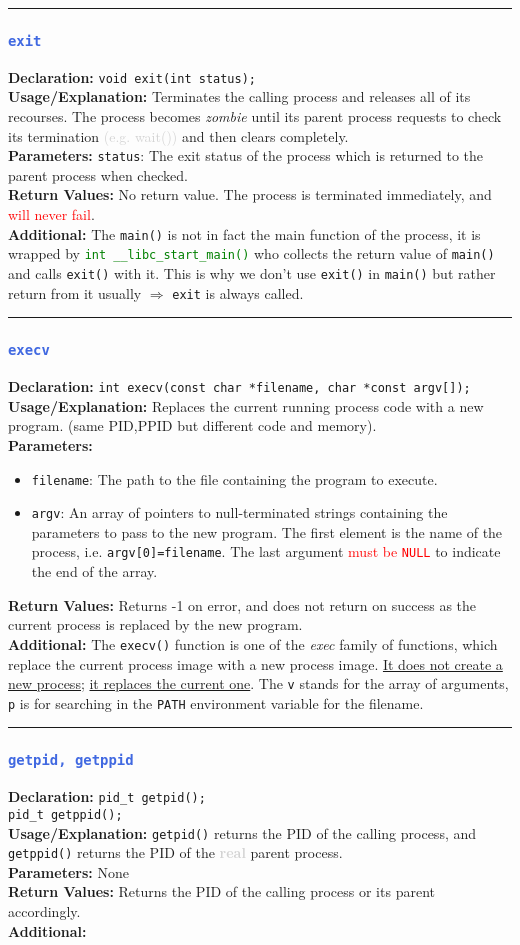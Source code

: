 \documentclass[openany,12pt]{book}
\newcommand{\code}[1]{\texttt{#1}}
\newcommand{\red}[1]{\textcolor{red}{#1}}
\newcommand{\blue}[1]{\textcolor{RoyalBlue}{#1}}
\newcommand{\gray}[1]{\textcolor{lightgray}{#1}}
\newcommand{\green}[1]{\textcolor{Green}{#1}}
\newcommand{\functionEntry}[6]{%
  \noindent\rule{\linewidth}{0.5pt}
  \subsubsection*{\blue{\large{\texttt{#1}}}}
  \textbf{Declaration:} \texttt{#2} \\
  \textbf{Usage/Explanation:} #3 \\
  \textbf{Parameters:} #4 \\
  \textbf{Return Values:} #5 \\
  \textbf{Additional:} #6
  \vspace{1em}
}
\newcommand{\functionEntryPar}[6]{%
  \noindent\rule{\linewidth}{0.5pt}
  \subsubsection*{\blue{\large{\texttt{#1}}}}
  \textbf{Declaration:} \texttt{#2} \\
  \textbf{Usage/Explanation:} #3 \\
  \textbf{Parameters:}
  \begin{itemize}[leftmargin=*]
    #4
  \end{itemize}
  \textbf{Return Values:} #5 \\
  \textbf{Additional:} #6
  \vspace{1em}
}
\begin{document}
\functionEntry{exit}
{void exit(int status);}
{Terminates the calling process and releases all of its recourses. The process becomes \textit{zombie} until its parent process requests to check its termination \gray{(e.g. wait())} and then clears completely.}
{\code{status}: The exit status of the process which is returned to the parent process when checked.}
{No return value. The process is terminated immediately, and \red{will never fail}.}
{The \code{main()} is not in fact the main function of the process, it is wrapped by \green{\code{int \_\_libc\_start\_main()}} who collects the return value of \code{main()} and calls \code{exit()} with it. This is why we don't use \code{exit()} in \code{main()} but rather return from it usually $\Longrightarrow$ \code{exit} is always called.\label{func:exit}}



\functionEntryPar{execv}
{int execv(const char *filename, char *const argv[]);}
{Replaces the current running process code with a new program. (same PID,PPID but different code and memory).}
{\item \code{filename}: The path to the file containing the program to execute.
  \item \code{argv}: An array of pointers to null-terminated strings containing the parameters to pass to the new program. The first element is the name of the process, i.e. \code{argv[0]=filename}. The last argument \red{must be \code{NULL}} to indicate the end of the array.}
{Returns -1 on error, and does not return on success as the current process is replaced by the new program.}
{The \code{execv()} function is one of the \textit{exec} family of functions, which replace the current process image with a new process image. \underline{It does not create a new process;} \underline{it replaces the current one}. The \code{v} stands for the array of arguments, \code{p} is for searching in the \code{PATH} environment variable for the filename. \label{func:execv}}



\functionEntry{getpid, getppid}
{pid\_t getpid();\\ pid\_t getppid();}
{\code{getpid()} returns the PID of the calling process, and \code{getppid()} returns the PID of the \textbf{\gray{real}} parent process.}
{None}
{Returns the PID of the calling process or its parent accordingly.}
{\label{func:getpid}}
\end{document}
